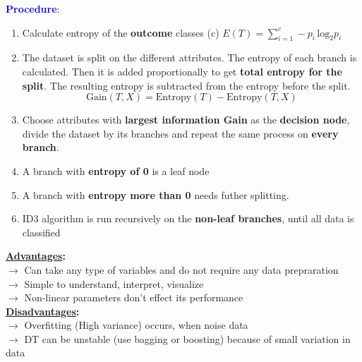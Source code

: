 \documentclass[letterpaper, 10.5pt,landscape]{article}
\begin{document}
\begin{multicols*}{3}
\vspace{3pt}
\textbf{\textcolor{blue}{Procedure}}:
\vspace{-3pt}
\begin{enumerate}
    \item Calculate entropy of the \textbf{outcome} classes (c) \(\boxed{E(T) = \sum^{c}_{i=1} -p_{i} \, \text{log}_{2}p_{i}} \)
    \vspace{-2pt}
    \item The dataset is split on the different attributes. The entropy of each branch is calculated. Then it is added proportionally to get \textbf{total entropy for the split}. The resulting entropy is subtracted from the entropy before the split.
    \vspace{-3pt}
    \[\boxed{\text{Gain}(T,X) = \text{Entropy}(T) - \text{Entropy}(T, X) }\]
    \vspace{-10pt}
    \item Choose attributes with \textbf{largest information Gain} as the \textbf{decision node}, divide the dataset by its branches and repeat the same process on \textbf{every branch}.
    \vspace{-2pt}
    \item A branch with \textbf{entropy of 0} is a leaf node
    \vspace{-2pt}
    \item A branch with \textbf{entropy more than 0} needs futher splitting.
    \vspace{-2pt}
    \item ID3 algorithm is run recursively on the \textbf{non-leaf branches}, until all data is classified
    \vspace{-2pt}
\end{enumerate}

\textbf{\underline{Advantages}:} \\
$\rightarrow$ Can take any type of variables and do not require any data prepraration \\
$\rightarrow$ Simple to understand, interpret, visualize \\
$\rightarrow$ Non-linear parameters don't effect its performance \\

\vspace{3pt}
\textbf{\underline{Disadvantages}:} \\
$\rightarrow$ Overfitting (High variance) occurs, when noise data \\
$\rightarrow$ DT can be unstable (use bagging or boosting) because of small variation in data


\end{multicols*}
\end{document}
